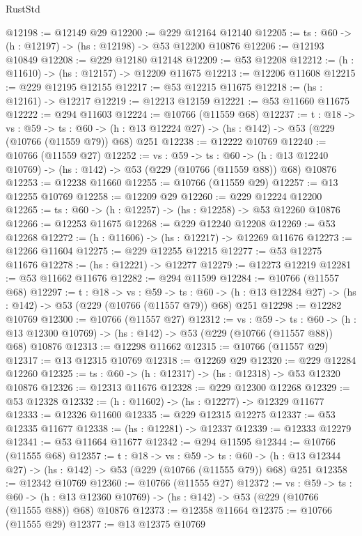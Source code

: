 \begin{lexlean}{RustStd}
\begin{coremodule}
@12198 := @12149 @29
@12200 := @229 @12164 @12140
@12205 := {ts : @60} -> (h : @12197) -> (hs : @12198) -> @53 @12200 @10876
@12206 := @12193 @10849
@12208 := @229 @12180 @12148
@12209 := @53 @12208
@12212 := (h : @11610) -> (hs : @12157) -> @12209 @11675
@12213 := @12206 @11608
@12215 := @229 @12195 @12155
@12217 := @53 @12215 @11675
@12218 := (hs : @12161) -> @12217
@12219 := @12213 @12159
@12221 := @53 @11660 @11675
@12222 := @294 @11603
@12224 := @10766 (@11559 @68)
@12237 := {t : @18} ->
  {vs : @59} ->
  {ts : @60} -> (h : @13 @12224 @27) -> (hs : @142) -> @53 (@229 (@10766 (@11559 @79)) @68) @251
@12238 := @12222 @10769
@12240 := @10766 (@11559 @27)
@12252 := {vs : @59} ->
  {ts : @60} ->
  (h : @13 @12240 @10769) -> (hs : @142) -> @53 (@229 (@10766 (@11559 @88)) @68) @10876
@12253 := @12238 @11660
@12255 := @10766 (@11559 @29)
@12257 := @13 @12255 @10769
@12258 := @12209 @29
@12260 := @229 @12224 @12200
@12265 := {ts : @60} -> (h : @12257) -> (hs : @12258) -> @53 @12260 @10876
@12266 := @12253 @11675
@12268 := @229 @12240 @12208
@12269 := @53 @12268
@12272 := (h : @11606) -> (hs : @12217) -> @12269 @11676
@12273 := @12266 @11604
@12275 := @229 @12255 @12215
@12277 := @53 @12275 @11676
@12278 := (hs : @12221) -> @12277
@12279 := @12273 @12219
@12281 := @53 @11662 @11676
@12282 := @294 @11599
@12284 := @10766 (@11557 @68)
@12297 := {t : @18} ->
  {vs : @59} ->
  {ts : @60} -> (h : @13 @12284 @27) -> (hs : @142) -> @53 (@229 (@10766 (@11557 @79)) @68) @251
@12298 := @12282 @10769
@12300 := @10766 (@11557 @27)
@12312 := {vs : @59} ->
  {ts : @60} ->
  (h : @13 @12300 @10769) -> (hs : @142) -> @53 (@229 (@10766 (@11557 @88)) @68) @10876
@12313 := @12298 @11662
@12315 := @10766 (@11557 @29)
@12317 := @13 @12315 @10769
@12318 := @12269 @29
@12320 := @229 @12284 @12260
@12325 := {ts : @60} -> (h : @12317) -> (hs : @12318) -> @53 @12320 @10876
@12326 := @12313 @11676
@12328 := @229 @12300 @12268
@12329 := @53 @12328
@12332 := (h : @11602) -> (hs : @12277) -> @12329 @11677
@12333 := @12326 @11600
@12335 := @229 @12315 @12275
@12337 := @53 @12335 @11677
@12338 := (hs : @12281) -> @12337
@12339 := @12333 @12279
@12341 := @53 @11664 @11677
@12342 := @294 @11595
@12344 := @10766 (@11555 @68)
@12357 := {t : @18} ->
  {vs : @59} ->
  {ts : @60} -> (h : @13 @12344 @27) -> (hs : @142) -> @53 (@229 (@10766 (@11555 @79)) @68) @251
@12358 := @12342 @10769
@12360 := @10766 (@11555 @27)
@12372 := {vs : @59} ->
  {ts : @60} ->
  (h : @13 @12360 @10769) -> (hs : @142) -> @53 (@229 (@10766 (@11555 @88)) @68) @10876
@12373 := @12358 @11664
@12375 := @10766 (@11555 @29)
@12377 := @13 @12375 @10769

\end{coremodule}
\end{lexlean}
